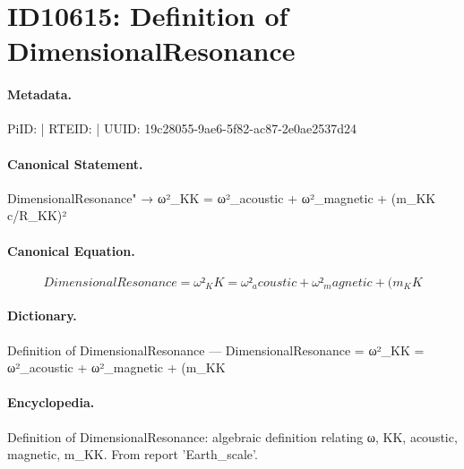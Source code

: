 \section*{ID10615: Definition of DimensionalResonance}
\paragraph{Metadata.}
PiID:  | RTEID:  | UUID: 19c28055-9ae6-5f82-ac87-2e0ae2537d24

\paragraph{Canonical Statement.}
DimensionalResonance" → ω²\_KK = ω²\_acoustic + ω²\_magnetic + (m\_KK c/R\_KK)²

\paragraph{Canonical Equation.}
\[
DimensionalResonance = ω²_KK = ω²_acoustic + ω²_magnetic + (m_KK
\]

\paragraph{Dictionary.}
Definition of DimensionalResonance — DimensionalResonance = ω²\_KK = ω²\_acoustic + ω²\_magnetic + (m\_KK

\paragraph{Encyclopedia.}
Definition of DimensionalResonance: algebraic definition relating ω, KK, acoustic, magnetic, m\_KK. From report 'Earth\_scale'.
